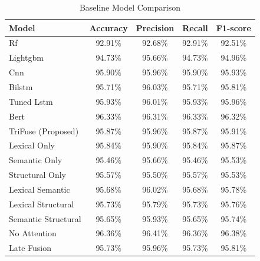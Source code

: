\begin{table}[htbp]
\caption{Baseline Model Comparison}
\label{tab:baseline_comp}
\centering
\begin{tabular}{|l|c|c|c|c|}
\hline
Model & Accuracy & Precision & Recall & F1-score \\
\hline
Rf & 92.91\% & 92.68\% & 92.91\% & 92.51\% \\
Lightgbm & 94.73\% & 95.66\% & 94.73\% & 94.96\% \\
Cnn & 95.90\% & 95.96\% & 95.90\% & 95.93\% \\
Bilstm & 95.71\% & 96.03\% & 95.71\% & 95.81\% \\
Tuned Lstm & 95.93\% & 96.01\% & 95.93\% & 95.96\% \\
Bert & 96.33\% & 96.31\% & 96.33\% & 96.32\% \\
TriFuse (Proposed) & 95.87\% & 95.96\% & 95.87\% & 95.91\% \\
Lexical Only & 95.84\% & 95.90\% & 95.84\% & 95.87\% \\
Semantic Only & 95.46\% & 95.66\% & 95.46\% & 95.53\% \\
Structural Only & 95.57\% & 95.50\% & 95.57\% & 95.53\% \\
Lexical Semantic & 95.68\% & 96.02\% & 95.68\% & 95.78\% \\
Lexical Structural & 95.73\% & 95.79\% & 95.73\% & 95.76\% \\
Semantic Structural & 95.65\% & 95.93\% & 95.65\% & 95.74\% \\
No Attention & 96.36\% & 96.41\% & 96.36\% & 96.38\% \\
Late Fusion & 95.73\% & 95.96\% & 95.73\% & 95.81\% \\
\hline
\end{tabular}
\end{table}